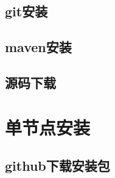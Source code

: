 \documentclass[letterpaper,10pt,english]{sphinxmanual}
\begin{document}
\subsection{git安装}
\label{\detokenize{installation/compile:git}}
\begin{sphinxVerbatim}[commandchars=\\\{\}]
  
\end{sphinxVerbatim}


\subsection{maven安装}
\label{\detokenize{installation/compile:maven}}
\begin{sphinxVerbatim}[commandchars=\\\{\}]
  
\end{sphinxVerbatim}


\subsection{源码下载}
\label{\detokenize{installation/compile:id2}}
\begin{sphinxVerbatim}[commandchars=\\\{\}]
  
\end{sphinxVerbatim}


\section{单节点安装}
\label{\detokenize{installation/standardlone:id1}}\label{\detokenize{installation/standardlone::doc}}

\subsection{github下载安装包}
\label{\detokenize{installation/standardlone:github}}
\begin{sphinxVerbatim}[commandchars=\\\{\}]
 
\end{sphinxVerbatim}
\end{document}
